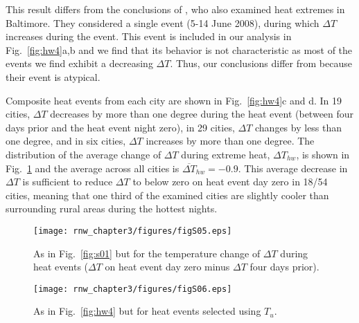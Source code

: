{This result differs from the conclusions of \cite{li2013synergistic}, who also examined heat extremes in Baltimore. They considered a single event (5-14 June 2008), during which $\Delta T$  increases during the event. This event is included in our analysis in Fig.~\ref{fig:hw4}a,b and we find that its behavior is not characteristic as most of the events we find exhibit a decreasing $\Delta T$. Thus, our conclusions differ from \cite{li2013synergistic} because their event is atypical. %

Composite heat events from each city are shown in Fig.~\ref{fig:hw4}c and d.
In 19 cities, $\Delta T$ decreases by more than one degree during the heat event (between four days prior and the heat event night zero), in 29 cities, $\Delta T$ changes by less than one degree, and in six cities, $\Delta T$ increases by more than one degree.
The distribution of the average change of $\Delta T$ during extreme heat, $\Delta T_{hw}$, is shown in  Fig.~\ref{fig:s05} and the average across all cities is $\overline{\Delta T}_{hw} = -0.9$. This average decrease in $\Delta T$ is sufficient to reduce $\Delta T$ to below zero on heat event day zero in 18/54 cities, meaning that one third of the examined cities are slightly cooler than surrounding rural areas during the hottest nights. 

\begin{figure}
\texttt{[image: rnw\_chapter3/figures/figS05.eps]}
\caption{As in Fig.~\ref{fig:s01} but for the temperature change of $\Delta T$ during heat events ($\Delta T$ on heat event day zero minus $\Delta T$ four days prior). %
\label{fig:s05}
 }
\end{figure}

\begin{figure}
\texttt{[image: rnw\_chapter3/figures/figS06.eps]}
\caption{As in Fig.~\ref{fig:hw4} but for heat events selected using $T_u$. %
\label{fig:s06}
}
\end{figure}

}
